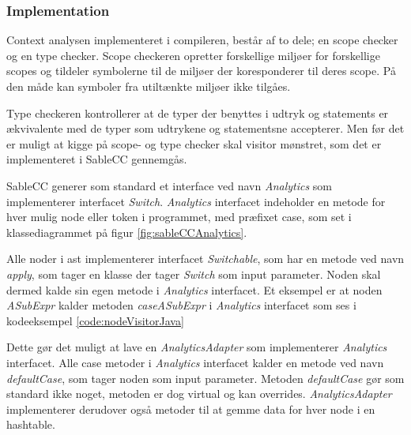 \subsubsection{Implementation}
\label{ssec:contextimple}
Context analysen implementeret i compileren, består af to dele; en scope checker og en type checker. Scope checkeren opretter forskellige miljøer for forskellige scopes og tildeler symbolerne til de miljøer der koresponderer til deres scope. På den måde kan symboler fra utiltænkte miljøer ikke tilgåes.

Type checkeren kontrollerer at de typer der benyttes i udtryk og statements er ækvivalente med de typer som udtrykene og statementsne accepterer. Men før det er muligt at kigge på scope- og type checker skal visitor mønstret, som det er implementeret i SableCC gennemgås.

\label{sct:visitorSableCC}
SableCC generer som standard et interface ved navn \textit{Analytics} som implementerer interfacet \textit{Switch}. \textit{Analytics} interfacet indeholder en metode for hver mulig node eller token i programmet, med præfixet case, som set i klassediagrammet på figur \ref{fig:sableCCAnalytics}.

 Alle noder i \gls{ast} implementerer interfacet \textit{Switchable}, som har en metode ved navn \textit{apply}, som tager en klasse der tager \textit{Switch} som input parameter. Noden skal dermed kalde sin egen metode i \textit{Analytics} interfacet. Et eksempel er at noden \textit{ASubExpr} kalder metoden \textit{caseASubExpr} i \textit{Analytics} interfacet som ses i kodeeksempel \ref{code:nodeVisitorJava}


\noindent Dette gør det muligt at lave en \textit{AnalyticsAdapter} som implementerer \textit{Analytics} interfacet. Alle case metoder i \textit{Analytics} interfacet kalder en metode ved navn \textit{defaultCase}, som tager noden som input parameter. Metoden \textit{defaultCase} gør som standard ikke noget, metoden er dog virtual og kan overrides. \textit{AnalyticsAdapter} implementerer derudover også metoder til at gemme data for hver node i en hashtable.


